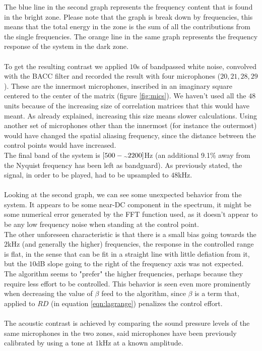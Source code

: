 The blue line in the second graph represents the frequency content that is found in the bright zone. Please note that the graph is break down by frequencies, this means that the total energy in the zone is the sum of all the contributions from the single frequencies. The orange line in the same graph represents the frequency response of the system in the dark zone.
\\
\\
To get the resulting contrast we applied $10$s of bandpassed white noise, convolved with the BACC filter and recorded the result with four microphones ($20, 21, 28, 29$). These are the innermost microphones, inscribed in an imaginary square centered to the center of the matrix (figure \ref{fig:mics}). We haven't used all the $48$ units because of the increasing size of correlation matrices that this would have meant. As already explained, increasing this size means slower calculations. Using another set of microphones other than the innermost (for instance the outermost) would have changed the spatial aliasing frequency, since the distance between the control points would have increased.
\\
The final band of the system is $[500-\tld 2200]$Hz (an additional 9.1\% away from the Nyquist frequency has been left as bandguard). As previously stated, the signal, in order to be played, had to be upsampled to $48$kHz.
\\
\\
Looking at the second graph, we can see some unexpected behavior from the system. It appears to be some near-DC component in the spectrum, it might be some numerical error generated by the FFT function used, as it doesn't appear to be any low frequency noise when standing at the control point.
\\
The other unforeseen characteristic is that there is a small bias going towards the $2$kHz (and generally the higher) frequencies, the response in the controlled range is flat, in the sense that can be fit in a straight line with little defiation from it, but the \tld$10$dB slope going to the right of the frequency axis was not expected. The algorithm seems to "prefer" the higher frequencies, perhaps because they require less effort to be controlled. This behavior is seen even more prominently when decreasing the value of $\beta$ feed to the algorithm, since $\beta$ is a term that, applied to $RD$ (in equation \ref{eqn:lagrange}) penalizes the control effort.
\\
\\
The acoustic contrast is achieved by comparing the sound pressure levels of the same microphones in the two zones, said microphones have been previously calibrated by using a tone at $1$kHz at a known amplitude.
